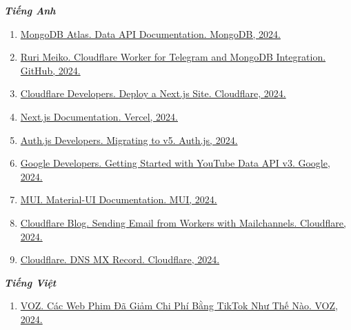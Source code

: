 \renewcommand{\labelenumi}{[\arabic{enumi}]}
\textbf{\textit{Tiếng Anh}}
\begin{enumerate}
    \item \href{https://www.mongodb.com/docs/atlas/app-services/data-api/}{MongoDB Atlas. Data API Documentation. MongoDB, 2024.}
    \item \href{https://github.com/RuriMeiko/worker-cloudflare-telegram-mongodb}{Ruri Meiko. Cloudflare Worker for Telegram and MongoDB Integration. GitHub, 2024.}
    \item \href{https://developers.cloudflare.com/pages/framework-guides/nextjs/deploy-a-nextjs-site/}{Cloudflare Developers. Deploy a Next.js Site. Cloudflare, 2024.}
    \item \href{https://nextjs.org/docs}{Next.js Documentation. Vercel, 2024.}
    \item \href{https://authjs.dev/getting-started/migrating-to-v5}{Auth.js Developers. Migrating to v5. Auth.js, 2024.}
    \item \href{https://developers.google.com/youtube/v3/getting-started}{Google Developers. Getting Started with YouTube Data API v3. Google, 2024.}
    \item \href{https://mui.com/material-ui/getting-started/}{MUI. Material-UI Documentation. MUI, 2024.}
    \item \href{https://blog.cloudflare.com/sending-email-from-workers-with-mailchannels}{Cloudflare Blog. Sending Email from Workers with Mailchannels. Cloudflare, 2024.}
    \item \href{https://www.cloudflare.com/learning/dns/dns-records/dns-mx-record/}{Cloudflare. DNS MX Record. Cloudflare, 2024.}
\end{enumerate}

\textbf{\textit{Tiếng Việt}}
\begin{enumerate}
    \item \href{https://voz.vn/t/cac-web-phim-da-giam-chi-phi-bang-tiktok-nhu-the-nao.913788/}{VOZ. Các Web Phim Đã Giảm Chi Phí Bằng TikTok Như Thế Nào. VOZ, 2024.}
\end{enumerate}